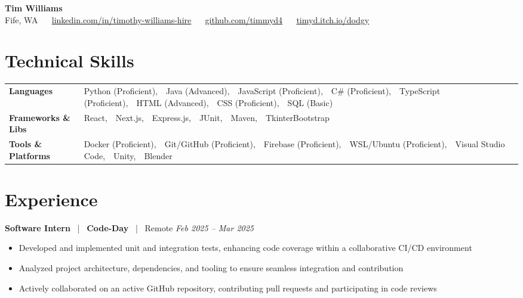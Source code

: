 \documentclass[10pt, letterpaper]{article}
\newcommand{\jobhead}[4]{%
  \vspace{5pt}%
  {\bfseries\color{dark}#1}%
  ~{\color{light}|}~%
  {\bfseries\color{navy}#2}%
  ~{\color{light}|}~%
  {\color{light}#3}%
  \hfill{\color{light}\small\textit{#4}}\\[-2pt]%
}
\newcommand{\skillrow}[2]{%
  {\bfseries #1} & #2 \\[2pt]%
}
\begin{document}

\begin{center}
  {\huge\bfseries\color{navy} Tim Williams}\\[4pt]
  {\small\color{light}
    Fife, WA
    ~\textbullet~
    \href{https://linkedin.com/in/timothy-williams-hire}{linkedin.com/in/timothy-williams-hire}
    ~\textbullet~
    \href{https://github.com/timmyd4}{github.com/timmyd4}
    ~\textbullet~
    \href{https://timyd.itch.io/dodgy}{timyd.itch.io/dodgy}
  }
\end{center}

\vspace{2pt}

\section{Technical Skills}

\begin{tabular}{@{}p{1.6in} p{5.2in}@{}}
  \skillrow{Languages}{Python (Proficient),\ \ Java (Advanced),\ \ JavaScript (Proficient),\ \ C\# (Proficient),\ \ TypeScript (Proficient),\ \ HTML (Advanced),\ \ CSS (Proficient),\ \ SQL (Basic)}
  \skillrow{Frameworks \& Libs}{React,\ \ Next.js,\ \ Express.js,\ \ JUnit,\ \ Maven,\ \ TkinterBootstrap}
  \skillrow{Tools \& Platforms}{Docker (Proficient),\ \ Git/GitHub (Proficient),\ \ Firebase (Proficient),\ \ WSL/Ubuntu (Proficient),\ \ Visual Studio Code,\ \ Unity,\ \ Blender}
\end{tabular}

\section{Experience}

\jobhead{Software Intern}{Code-Day}{Remote}{Feb 2025 – Mar 2025}
\begin{itemize}
  \item Developed and implemented unit and integration tests, enhancing code coverage within a collaborative CI/CD environment
  \item Analyzed project architecture, dependencies, and tooling to ensure seamless integration and contribution
  \item Actively collaborated on an active GitHub repository, contributing pull requests and participating in code reviews
\end{itemize}
\end{document}
